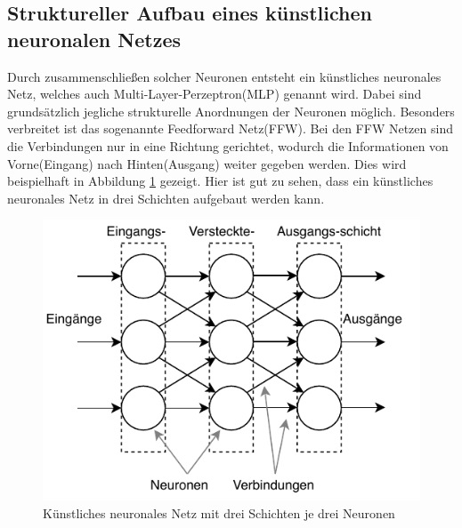 \subsection{Struktureller Aufbau eines künstlichen neuronalen Netzes}
Durch zusammenschließen solcher Neuronen entsteht ein künstliches neuronales Netz, welches auch Multi-Layer-Perzeptron(MLP) genannt wird. Dabei sind grundsätzlich jegliche strukturelle Anordnungen der Neuronen möglich. Besonders verbreitet ist das sogenannte Feedforward Netz(FFW). Bei den FFW Netzen sind die Verbindungen nur in eine Richtung gerichtet, wodurch die Informationen von Vorne(Eingang) nach Hinten(Ausgang) weiter gegeben werden. Dies wird beispielhaft in Abbildung \ref{fig:neural_network} gezeigt. Hier ist gut zu sehen, dass ein künstliches neuronales Netz in drei Schichten aufgebaut werden kann. \cite[p.~21]{Silva2016} 

\begin{figure}[htb]
  \centering  
  \includegraphics[scale=1.2]{img/mlp.pdf}
  \caption{Künstliches neuronales Netz mit drei Schichten je drei Neuronen}
  \label{fig:neural_network}
\end{figure}


